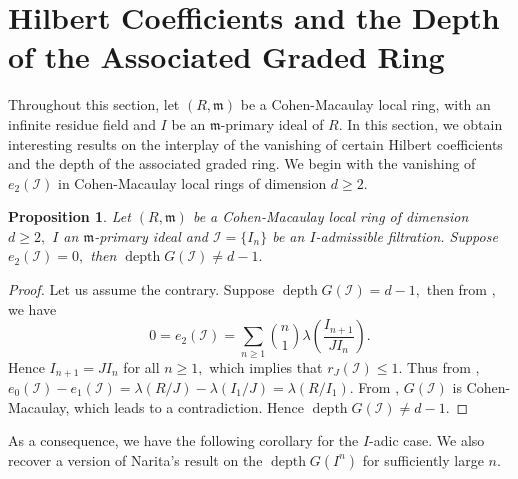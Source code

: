 \documentclass[reqno,a4paper,dvipsnames]{amsart}
\newcommand{\m}{\mathfrak{m} }
\newcommand{\depth}{\operatorname{depth}}
\newtheorem{proposition}[theorem]{Proposition}
\theoremstyle{definition}
\begin{document}
\section{Hilbert Coefficients and the Depth of the Associated Graded Ring} \label{section6}
Throughout this section, let $(R, \m)$  be a Cohen-Macaulay local ring,   with an  infinite residue field and $I$   be an $\m$-primary ideal of $R$. 
In this section, we obtain interesting results on the interplay of the vanishing of certain Hilbert coefficients and the depth of the associated graded ring. 
We begin with  the vanishing of  $e_{2}(\mathcal{I})$ in  Cohen-Macaulay local rings of dimension $d \geq 2$.  

\begin{proposition} \label{e2equalszeroCM}
    Let $(R, \m)$ be a Cohen-Macaulay local ring of dimension $d \geq 2,$ $I$ an $\m$-primary ideal and $\mathcal{I}=\{I_{n}\}$ be an $I$-admissible filtration. Suppose $e_{2}(\mathcal{I})=0,$ then $\depth G(\mathcal{I}) \neq d-1.$
\end{proposition}

\begin{proof}
     Let us assume the contrary. 
    Suppose  $\depth G(\mathcal{I}) = d-1,$ then  from  \cite[Theorem 2.5]{rv}, we have 
    \begin{equation} \label{expressionfore2}
0 =  e_{2}(\mathcal{I})
 =\displaystyle \sum_{n \geq 1} 
        \binom{n}{1}\lambda\left(\frac{I_{n+1}}{JI_{n}}\right).
    \end{equation}
Hence   $I_{n+1}=JI_{n}$ for all $n \geq 1,$ which implies that  $r_{J}(\mathcal{I}) \leq 1$.  Thus from   \cite[Theorem 2.5]{rv}, $e_{0}(\mathcal{I})-e_{1}(\mathcal{I})=\lambda(R/J)-\lambda(I_{1}/J)=\lambda(R/I_{1})$. From \cite[Theorem 2.9(3)]{rv}, $G(\mathcal{I})$ is Cohen-Macaulay, which leads to a contradiction.  Hence $\depth G(\mathcal{I}) \neq d-1.$
\end{proof}

As a consequence, we have the following corollary for the $I$-adic case. We also recover a version of  Narita's result \cite[Theorem 1]{narita} on the $\depth G(I^{n})$ for sufficiently large $n$. 
\end{document}
